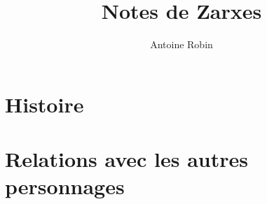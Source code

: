 \documentclass[10pt,a4paper]{book}
\author{ Antoine Robin}
\title{Notes de Zarxes}
\begin{document}
\maketitle
\chapter{Histoire}
\chapter{Relations avec les autres personnages}
\end{document}
